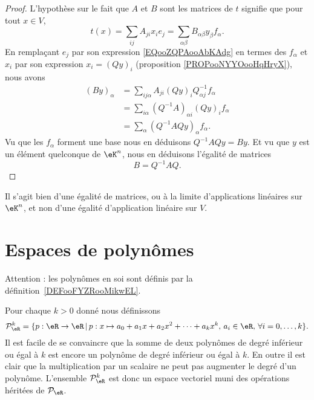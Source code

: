 \begin{proof}
    L'hypothèse sur le fait que \( A\) et \( B\) sont les matrices de \( t\) signifie que pour tout \( x\in V\),
    \begin{equation}
        t(x)=\sum_{ij}A_{ji}x_ie_j=\sum_{\alpha\beta}B_{\alpha\beta}y_{\beta}f_{\alpha}.
    \end{equation}
    En remplaçant \( e_j\) par son expression \eqref{EQooZQPAooAbKAdg} en termes des \( f_{\alpha}\) et \( x_i\) par son expression \( x_i=(Qy)_i\) (proposition \ref{PROPooNYYOooHqHryX}), nous avons
    \begin{subequations}
        \begin{align}
            (By)_{\alpha}&=\sum_{ij\alpha}A_{ji}(Qy)_iQ^{-1}_{\alpha j}f_{\alpha}\\
            &=\sum_{i \alpha}(Q^{-1}A)_{\alpha i}(Qy)_if_{\alpha}\\
            &=\sum_{\alpha}(Q^{-1} AQy)_{\alpha}f_{\alpha}.
        \end{align}
    \end{subequations}
    Vu que les \( f_{\alpha}\) forment une base nous en déduisons \( Q^{-1}AQy=By\). Et vu que \( y\) est un élément quelconque de \( \eK^n\), nous en déduisons l'égalité de matrices
    \begin{equation}        \label{ooWKTYooOJfclT}
        B=Q^{-1}AQ.
    \end{equation}
\end{proof}
Il s'agit bien d'une égalité de matrices, ou à la limite d'applications linéaires sur \( \eK^n\), et non d'une égalité d'application linéaire sur \( V\).

\section{Espaces de polynômes}
\label{SecEspacePolynomes}

Attention : les polynômes en soi sont définis par la définition~\ref{DEFooFYZRooMikwEL}.

Pour chaque $k>0$ donné nous définissons
\begin{equation}
\mathcal{P}_\eR^k=\{p:\eR\to \eR\,|\, p : x\mapsto a_0+a_1 x +a_2 x^2 + \cdots+a_k x^k, \, a_i\in\eR,\,\forall i=0,\ldots,k\}.
\end{equation}
Il est facile de se convaincre que la somme de deux polynômes de degré inférieur ou égal à $k$ est encore un polynôme de degré inférieur ou égal à $k$. En outre il est clair que la multiplication par un scalaire ne peut pas augmenter le degré d'un polynôme. L'ensemble $\mathcal{P}_\eR^k$ est donc un espace vectoriel muni des opérations héritées de $\mathcal{P}_{\eR}$.

